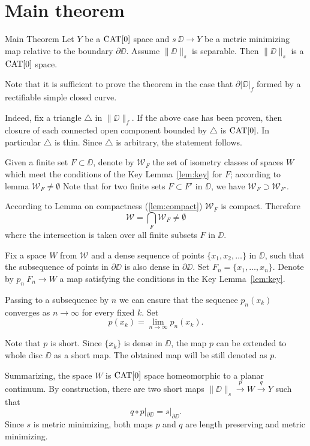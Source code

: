 \documentclass[a4paper,10pt]{amsart}
\begin{document}
\section{Main theorem}

\begin{thm}{Main Theorem}\label{thm:main}
Let $Y$ be a $\mathop{\rm CAT}\nolimits[0]$ space 
and $s\:\DD\to Y$ be a metric minimizing map relative to the boundary $\partial\DD$.
Assume $\|\DD\|_s$  is separable. 
Then $\|\DD\|_s$ is a $\mathop{\rm CAT}\nolimits[0]$ space.
\end{thm}


Note that it is sufficient to prove the theorem 
in the case that $\partial |\DD|_f$ formed by a rectifiable simple closed curve.

Indeed, fix a triangle $\triangle$ in $\|\DD\|_f$.
If the above case has been proven, 
then closure of each connected open component bounded by $\triangle$ is $\mathop{\rm CAT}\nolimits[0]$.
In particular $\triangle$ is thin.
Since $\triangle$ is arbitrary, the statement follows.

Given a finite set $F\subset \DD$,
denote by $\mathcal{W}_F$
the set of isometry classes of spaces $W$ which meet the conditions of the Key Lemma~\ref{lem:key}
for $F$;
according to lemma $\mathcal{W}_F\ne\emptyset$
Note that for two finite sets $F\subset F'$ in $\DD$,
we have $\mathcal{W}_F\supset \mathcal{W}_{F'}$.

According to Lemma on compactness (\ref{lem:compact}) $\mathcal{W}_F$ is compact.
Therefore 
\[\mathcal{W}
=
\bigcap_{F}\mathcal{W}_F\ne \emptyset\]
where the intersection is taken over all finite subsets $F$ in $\DD$.

Fix a space $W$ from $\mathcal{W}$
and a dense sequence of points $\{x_1,x_2,\dots\}$ in $\DD$,
such that the subsequence of points in $\partial \DD$
is also dense in $\partial \DD$.
Set $F_n=\{x_1,\dots,x_n\}$.
Denote by $p_n\:F_n\to W$ a map satisfying the conditions in the Key Lemma~\ref{lem:key}.

Passing to a subsequence by $n$ we can ensure that the sequence
$p_n(x_k)$ converges as $n\to\infty$ for every fixed $k$.
Set 
\[p(x_k)=\lim_{n\to\infty} p_n(x_k).\]

Note that $p$ is short.
Since $\{x_k\}$ is dense in $\DD$,
the map $p$ can be extended to whole disc $\DD$ 
as a short map.
The obtained map will be still denoted as $p$.

Summarizing, the space $W$ is $\mathop{\rm CAT}\nolimits[0]$ space 
homeomorphic to a planar continuum.
By construction, there are two short maps 
$\|\DD\|_s\xrightarrow{p} W \xrightarrow{q} Y$
such that 
\[q\circ p|_{\partial\DD}=s|_{\partial\DD}.\]
Since $s$ is metric minimizing, both maps $p$ and $q$ are length preserving and metric minimizing.
\end{document}
